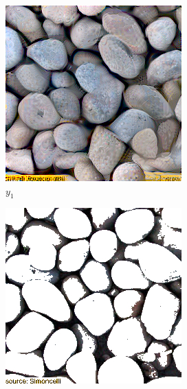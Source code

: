 \begin{figure}[ht]
    \centering    
    \begin{subfigure}{\textwidth}
        \centering
        \begin{subfigure}{0.2\textwidth}
            \centering
            \includegraphics[width=\textwidth]{images/01-pixels_vs_stats-pixels_target.jpg}
            \caption*{\(y_1\)}
            \label{fig:intro_pixels_vs_stats-pixels_target}
        \end{subfigure}
        \hfill
        \begin{subfigure}{0.2\textwidth}
            \centering
            \includegraphics[width=\textwidth]{images/01-pixels_vs_stats-bg.jpg}

\end{subfigure}
\end{subfigure}
\end{figure}
